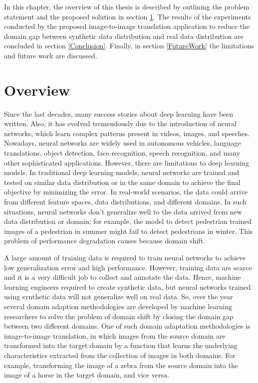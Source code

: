 \justifying
\setlength{\parskip}{1em}



In this chapter, the overview of this thesis is described by outlining the problem statement and the proposed solution in section \ref{Overview}. The results of the experiments conducted by the proposed image-to-image translation application to reduce the domain gap between synthetic data distribution and real data distribution are concluded in section \ref{Conclusion}. Finally, in section \ref{FutureWork} the limitations and future work are discussed.


\section{Overview}\label{Overview}

Since the last decades, many success stories about deep learning have been written. Also, it has evolved tremendously due to the introduction of neural networks, which learn complex patterns present in videos, images, and speeches. Nowadays, neural networks are widely used in autonomous vehicles, language translations, object detection, face recognition, speech recognition, and many other sophisticated applications. However, there are limitations to deep learning models. In traditional deep learning models, neural networks are trained and tested on similar data distribution or in the same domain to achieve the final objective by minimizing the error. In real-world scenarios, the data could arrive from different feature spaces, data distributions, and different domains. In such situations, neural networks don't generalize well to the data arrived from new data distribution or domain; for example, the model to detect pedestrian trained images of a pedestrian in summer might fail to detect pedestrians in winter. This problem of performance degradation causes because domain shift\cite{farahani2020brief}.

A large amount of training data is required to train neural networks to achieve low generalization error and high performance. However, training data are scarce and it is a very difficult job to collect and annotate the data. Hence, machine learning engineers required to create synthetic data, but neural networks trained using synthetic data will not generalize well on real data. So, over the year several domain adaption methodologies are developed by machine learning researchers to solve the problem of domain shift by closing the domain gap between two different domains\cite{farahani2020brief}. One of such domain adaptation methodologies is image-to-image translation, in which images from the source domain are transformed into the target domain by a function that learns the underlying characteristics extracted from the collection of images in both domains. For example, transforming the image of a zebra from the source domain into the image of a horse in the target domain, and vice versa.


